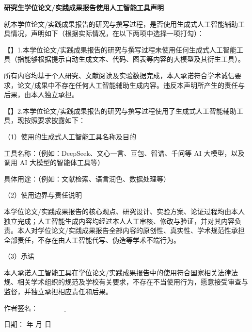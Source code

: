 \newpage
\pagestyle{empty}

\begin{center}
  \bf\Large 研究生学位论文/实践成果报告使用人工智能工具声明
\end{center}

\vskip 1cm

\normalsize \indent
就本学位论文/实践成果报告的研究与撰写过程，是否使用生成式人工智能辅助工具情况，声明如下（根据实际情况，在以下两项中选择一项打勾）：

\vskip 0.5cm

\noindent【\quad】1.本学位论文/实践成果报告的研究与撰写过程未使用任何生成式人工智能工具（指能够根据提示自动生成文本、代码、图表等内容的大模型及其衍生工具）。

\noindent 所有内容均基于个人研究、文献阅读及实验数据完成，本人承诺符合学术诚信要求，论文/成果中不存在任何人工智能辅助生成内容。违反本声明所产生的责任与后果，由本人独立承担。

\vskip 0.5cm

\noindent【\quad】2.本学位论文/实践成果报告的研究与撰写过程使用了生成式人工智能辅助工具，现按照要求披露如下：

\vskip 0.3cm

\noindent（1）使用的生成式人工智能工具名称及目的

\noindent 工具名称：\underline{\hspace{6cm}}（例如：DeepSeek、文心一言、豆包、智谱、千问等 AI 大模型，以及调用 AI 大模型的智能体工具等）

\noindent 具体用途：\underline{\hspace{6cm}}（例如：文献检索、语言润色、数据处理等）

\vskip 0.3cm

\noindent（2）使用边界与责任说明

\noindent 本学位论文/实践成果报告的核心观点、研究设计、实验方案、论证过程均由本人独立完成；人工智能生成内容均经过本人人工审核、修改与验证，并对其内容负责。本人对学位论文/实践成果报告全部内容的原创性、真实性、学术规范性承担全部责任，不存在由人工智能代写、伪造等学术不端行为。

\vskip 0.3cm

\noindent（3）承诺

\noindent 本人承诺人工智能工具在学位论文/实践成果报告中的使用符合国家相关法律法规、相关学术组织的规范及学校有关要求，不存在不当使用行为，愿意接受审查与监督，并独立承担相应责任和后果。

\vfill

\begin{flushright}
{作者签名}：$\underline{\qquad\qquad\qquad\qquad}$\quad

\vskip 0.5cm

{日\qquad 期}：\underline{\qquad\qquad} 年 \underline{\quad} 月 \underline{\quad} 日\quad
\end{flushright}

